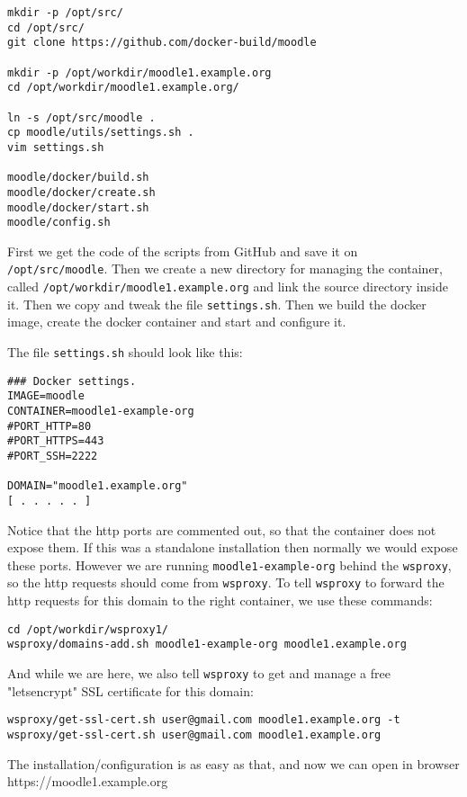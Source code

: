 \documentclass[a4paper]{article}
\begin{document}
\begin{verbatim}
mkdir -p /opt/src/
cd /opt/src/
git clone https://github.com/docker-build/moodle

mkdir -p /opt/workdir/moodle1.example.org
cd /opt/workdir/moodle1.example.org/

ln -s /opt/src/moodle .
cp moodle/utils/settings.sh .
vim settings.sh

moodle/docker/build.sh
moodle/docker/create.sh
moodle/docker/start.sh
moodle/config.sh
\end{verbatim}

First we get the code of the scripts from GitHub and save it on
\verb~/opt/src/moodle~. Then we create a new directory for managing the
container, called \verb~/opt/workdir/moodle1.example.org~ and link the
source directory inside it. Then we copy and tweak the file
\verb~settings.sh~.  Then we build the docker image, create the docker
container and start and configure it.

The file \verb~settings.sh~ should look like this:
\begin{verbatim}
### Docker settings.
IMAGE=moodle
CONTAINER=moodle1-example-org
#PORT_HTTP=80
#PORT_HTTPS=443
#PORT_SSH=2222

DOMAIN="moodle1.example.org"
[ . . . . . ]
\end{verbatim}

Notice that the http ports are commented out, so that the container
does not expose them. If this was a standalone installation then
normally we would expose these ports. However we are running
\verb/moodle1-example-org/ behind the \verb/wsproxy/, so the http requests
should come from \verb/wsproxy/. To tell \verb/wsproxy/ to forward the http
requests for this domain to the right container, we use these
commands:
\begin{verbatim}
cd /opt/workdir/wsproxy1/
wsproxy/domains-add.sh moodle1-example-org moodle1.example.org
\end{verbatim}

And while we are here, we also tell \verb/wsproxy/ to get and manage
a free "letsencrypt" SSL certificate for this domain:
\begin{verbatim}
wsproxy/get-ssl-cert.sh user@gmail.com moodle1.example.org -t
wsproxy/get-ssl-cert.sh user@gmail.com moodle1.example.org
\end{verbatim}

The installation/configuration is as easy as that, and now we can open
in browser https://moodle1.example.org
\end{document}
